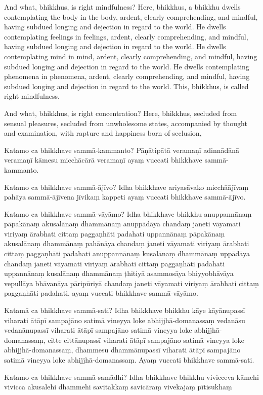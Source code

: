 And what, bhikkhus, is right mindfulness? Here, bhikkhus, a bhikkhu dwells
contemplating the body in the body, ardent, clearly comprehending, and mindful,
having subdued longing and dejection in regard to the world. He dwells
contemplating feelings in feelings, ardent, clearly comprehending, and mindful,
having subdued longing and dejection in regard to the world. He dwells
contemplating mind in mind, ardent, clearly comprehending, and mindful, having
subdued longing and dejection in regard to the world. He dwells contemplating
phenomena in phenomena, ardent, clearly comprehending, and mindful, having
subdued longing and dejection in regard to the world. This, bhikkhus, is called
right mindfulness.

And what, bhikkhus, is right concentration? Here, bhikkhus, secluded from
sensual pleasures, secluded from unwholesome states, accompanied by thought and
examination, with rapture and happiness born of seclusion,

\paliPage

Katamo ca bhikkhave sammā-kammanto? Pāṇātipātā veramaṇī adinnādānā veramaṇī
kāmesu micchācārā veramaṇī ayaṃ vuccati bhikkhave sammā-kammanto.

Katamo ca bhikkhave sammā-ājīvo? Idha bhikkhave ariyasāvako micchāājīvaṃ pahāya
sammā-ājīvena jīvikaṃ kappeti ayaṃ vuccati bhikkhave sammā-ājīvo.

Katamo ca bhikkhave sammā-vāyāmo? Idha bhikkhave bhikkhu anuppannānaṃ pāpakānaṃ
akusalānaṃ dhammānaṃ anuppādāya chandaṃ janeti vāyamati viriyaṃ ārabhati cittaṃ
paggaṇhāti padahati uppannānaṃ pāpakānaṃ akusalānaṃ dhammānaṃ pahānāya chandaṃ
janeti vāyamati viriyaṃ ārabhati cittaṃ paggaṇhāti padahati anuppannānaṃ
kusalānaṃ dhammānaṃ uppādāya chandaṃ janeti vāyamati viriyaṃ ārabhati cittaṃ
paggaṇhāti padahati uppannānaṃ kusalānaṃ dhammānaṃ ṭhitiyā asammosāya
bhiyyobhāvāya vepullāya bhāvanāya pāripūriyā chandaṃ janeti vāyamati viriyaṃ
ārabhati cittaṃ paggaṇhāti padahati. ayaṃ vuccati bhikkhave sammā-vāyāmo.

Katamā ca bhikkhave sammā-sati? Idha bhikkhave bhikkhu kāye kāyānupassī viharati
ātāpī sampajāno satimā vineyya loke abhijjhā-domanassaṃ vedanāsu vedanānupassī
viharati ātāpī sampajāno satimā vineyya loke abhijjhā-domanassaṃ, citte
cittānupassī viharati ātāpī sampajāno satimā vineyya loke abhijjhā-domanassaṃ,
dhammesu dhammānupassī viharati ātāpī sampajāno satimā vineyya loke
abhijjhā-domanassaṃ. Ayaṃ vuccati bhikkhave sammā-sati.

Katamo ca bhikkhave sammā-samādhi? Idha bhikkhave bhikkhu vivicceva kāmehi
vivicca akusalehi dhammehi savitakkaṃ savicāraṃ vivekajaṃ pītisukhaṃ

